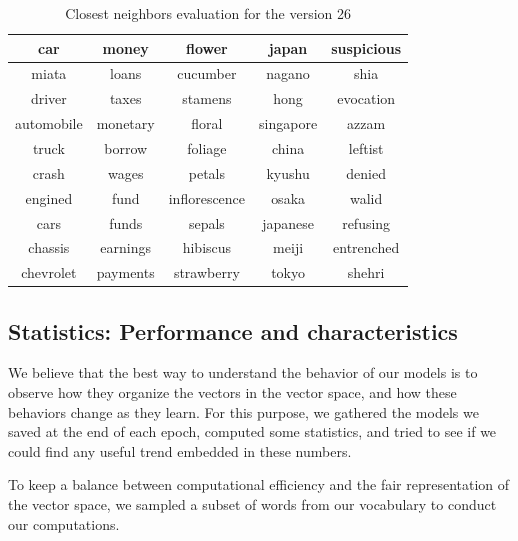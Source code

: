 \begin{table}[!ht]
\centering
\begin{tabular}{|c|c|c|c|c|}

\hline \rowcolor[HTML]{330001} 
\textcolor[HTML]{FFFFFF}{car} & \textcolor[HTML]{FFFFFF}{money} & \textcolor[HTML]{FFFFFF}{flower} & \textcolor[HTML]{FFFFFF}{japan} & \textcolor[HTML]{FFFFFF}{suspicious} \\ \hline \rowcolor[HTML]{E2EFDA} 

miata & loans & cucumber & nagano & shia \\ \hline
driver & taxes & stamens & hong & evocation \\ \hline \rowcolor[HTML]{E2EFDA} 
automobile & monetary & floral & singapore & azzam \\ \hline 
truck & borrow & foliage & china & leftist \\ \hline \rowcolor[HTML]{E2EFDA} 
crash & wages & petals & kyushu & denied \\ \hline
engined & fund & inflorescence & osaka & walid \\ \hline \rowcolor[HTML]{E2EFDA} 
cars & funds & sepals & japanese & refusing \\ \hline
chassis & earnings & hibiscus & meiji & entrenched \\ \hline \rowcolor[HTML]{E2EFDA} 
chevrolet & payments & strawberry & tokyo & shehri \\ \hline

\end{tabular}
\caption{Closest neighbors evaluation for the version 26}
\label{tab:v26-neighbors}
\end{table}


\subsection{Statistics: Performance and characteristics}
\label{sec:stats}

We believe that the best way to understand the behavior of our models is to observe how they organize the vectors in the vector space, and how these behaviors change as they learn. For this purpose, we gathered the models we saved at the end of each epoch, computed some statistics, and tried to see if we could find any useful trend embedded in these numbers.

To keep a balance between computational efficiency and the fair representation of the vector space, we sampled a subset of words from our vocabulary to conduct our computations.


